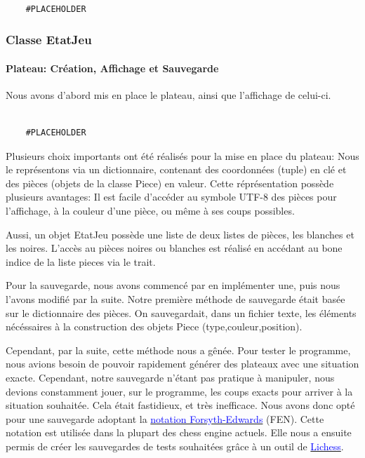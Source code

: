 \documentclass{article}
\begin{document}
\begin{verbatim}

    #PLACEHOLDER
\end{verbatim}
\subsubsection{Classe EtatJeu}
\paragraph{Plateau: Création, Affichage et Sauvegarde}
Nous avons d'abord mis en place le plateau, ainsi que l'affichage de celui-ci.
\begin{verbatim}

    #PLACEHOLDER
\end{verbatim}

Plusieurs choix importants ont été réalisés pour la mise en place du plateau:
Nous le représentons via un dictionnaire, contenant des coordonnées (tuple) en clé
et des pièces (objets de la classe Piece) en valeur. Cette réprésentation
possède plusieurs avantages: Il est facile d'accéder au symbole UTF-8 des pièces
pour l'affichage, à la couleur d'une pièce, ou même à ses coups possibles.

Aussi, un objet EtatJeu possède une liste de deux listes de pièces, les blanches et les noires.
L'accès au pièces noires ou blanches est réalisé en accédant au bone indice de la liste pieces via
le trait.

Pour la sauvegarde, nous avons commencé par en implémenter une, puis nous l'avons modifié par la suite.
Notre première méthode de sauvegarde était basée sur le dictionnaire des pièces.
On sauvegardait, dans un fichier texte, les éléments nécéssaires à la construction des objets Piece (type,couleur,position).

Cependant, par la suite, cette méthode nous a gênée. Pour tester le programme, nous avions besoin de pouvoir
rapidement générer des plateaux avec une situation exacte. Cependant, notre sauvegarde n'étant pas pratique à manipuler,
nous devions constamment jouer, sur le programme, les coups exacts pour arriver à la situation souhaitée. Cela était
fastidieux, et très inefficace. 
Nous avons donc opté pour une sauvegarde adoptant la \href{https://fr.wikipedia.org/wiki/Notation_Forsyth-Edwards}{\textcolor{blue}{notation Forsyth-Edwards}} (FEN).
Cette notation est utilisée dans la plupart des chess engine actuels. Elle nous a ensuite permis de créer les sauvegardes
de tests souhaitées grâce à un outil de \href{https://lichess.org/fr}{\textcolor{blue}{Lichess}}.
\end{document}
